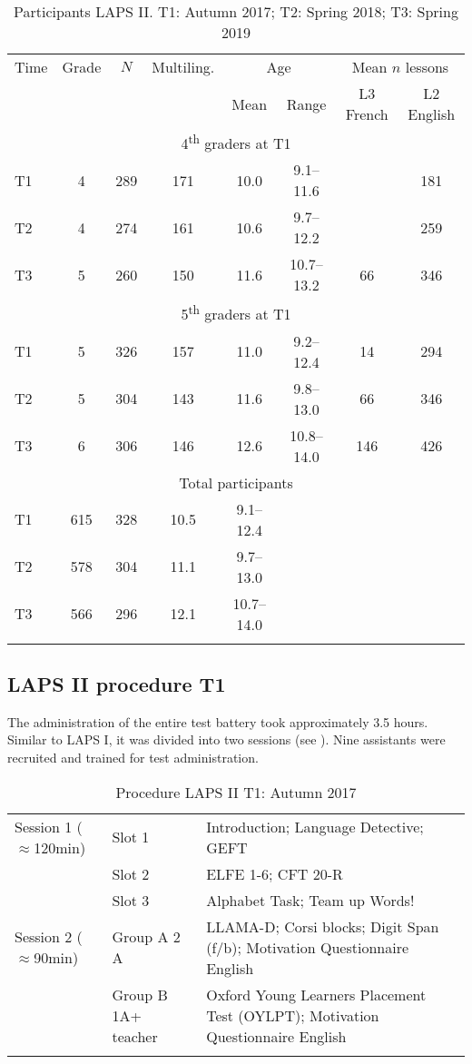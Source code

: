 \documentclass[output=paper]{langsci/langscibook}
\begin{document}
\begin{table}
\begin{tabular}{lccccccc} 
\lsptoprule
Time &	Grade &	$N$ & Multiling. & \multicolumn{2}{c}{Age} & \multicolumn{2}{c}{Mean $n$ lessons}\\\cmidrule(lr){5-6}\cmidrule(lr){7-8}
     &        &     &              &  Mean & Range & L3 French & L2 English\\\midrule
\multicolumn{8}{c}{4\textsuperscript{th} graders at T1}\\\midrule
T1 & 4 & 289 & 171 & 10.0 & 9.1--11.6  &    & 181\\
T2 & 4 & 274 & 161 & 10.6 & 9.7--12.2  &    & 259\\
T3 & 5 & 260 & 150 & 11.6 & 10.7--13.2 & 66 & 346\\\midrule
\multicolumn{8}{c}{5\textsuperscript{th} graders at T1}\\\midrule
T1 & 5 & 326 & 157 & 11.0 & 9.2--12.4 & 14 & 294\\
T2 & 5 & 304 & 143 & 11.6 & 9.8--13.0 & 66 & 346\\
T3 & 6 & 306 & 146 & 12.6 & 10.8--14.0 & 146 & 426\\\midrule
\multicolumn{8}{c}{Total participants}\\\midrule
T1 & 615 & 328 & 10.5 & 9.1--12.4 &   & \\
T2 & 578 & 304 & 11.1 & 9.7--13.0 &   & \\
T3 & 566 & 296 & 12.1 & 10.7--14.0&   & \\
\lspbottomrule
\end{tabular}
\caption{Participants LAPS II. T1: Autumn 2017; T2: Spring 2018; T3: Spring 2019\label{tab:02:5}}
\end{table}

 \subsection{LAPS II procedure T1}

The administration of the entire test battery took approximately 3.5 hours. Similar to LAPS I, it was divided into two sessions (see ). Nine assistants were recruited and trained for test administration.

\begin{table}
\begin{tabularx}{\textwidth}{llQ}
\lsptoprule
Session 1 (${\approx}$120min) & Slot 1 & Introduction; Language Detective; GEFT\\
& Slot 2 & ELFE 1-6; CFT 20-R\\
& Slot 3 & Alphabet Task; Team up Words!\\
Session 2 (${\approx}$90min) & Group A 2 A & LLAMA-D; Corsi blocks; Digit Span (f/b); Motivation Questionnaire English\\
& Group B 1A+ teacher & Oxford Young Learners Placement Test (OYLPT); Motivation Questionnaire English\\
\lspbottomrule
\end{tabularx}
\caption{Procedure LAPS II T1: Autumn 2017\label{tab:02:6}}
\end{table}
\end{document}
